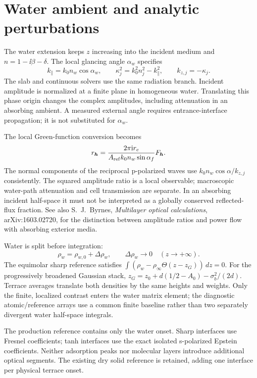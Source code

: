 \section{Water ambient and analytic perturbations}

The water extension keeps $z$ increasing into the incident medium and
$n=1-\ii\beta-\delta$.  The local glancing angle $\alpha_w$ specifies
\begin{equation}
 k_\parallel=k_0 n_w\cos\alpha_w,\qquad
 \kappa_j^2=k_0^2 n_j^2-k_\parallel^2,\qquad
 k_{z,j}=-\kappa_j.
\end{equation}
The slab and continuous solvers use the same radiation branch.  Incident
amplitude is normalized at a finite plane in homogeneous water.  Translating
this phase origin changes the complex amplitudes, including attenuation in an
absorbing ambient.  A measured external angle requires entrance-interface
propagation; it is not substituted for $\alpha_w$.

The local Green-function conversion becomes
\begin{equation}
 r_{\bm h}=\frac{2\pi\mathrm{i} r_e}{A_{\rm ref} k_0 n_w\sin\alpha_f}
 F_{\bm h}.
\end{equation}
The normal components of the reciprocal p-polarized waves use
$k_0 n_w\cos\alpha/k_{z,j}$ consistently.  The squared amplitude ratio is a
local observable; macroscopic water-path attenuation and cell transmission
are separate.  In an absorbing incident half-space it must not be interpreted
as a globally conserved reflected-flux fraction.  See also S.~J.~Byrnes,
\emph{Multilayer optical calculations}, arXiv:1603.02720, for the distinction
between amplitude ratios and power flow with absorbing exterior media.

Water is split before integration:
\begin{equation}
 \rho_w=\rho_{w,0}+\Delta\rho_w,\qquad
 \Delta\rho_w\longrightarrow0\quad (z\longrightarrow+\infty).
\end{equation}
The equimolar sharp reference satisfies
$\int(\rho_w-\rho_\infty\Theta(z-z_G))\,dz=0$.
For the progressively broadened Gaussian stack,
$z_G=z_0+d(1/2-A_0)-\sigma_b^2/(2d)$.
Terrace averages translate both densities by the same heights and weights.
Only the finite, localized contrast enters the water matrix element; the
diagnostic atomic/reference arrays use a common finite baseline rather than
two separately divergent water half-space integrals.


The production reference contains only the water onset.  Sharp interfaces use
Fresnel coefficients; tanh interfaces use the exact isolated s-polarized
Epstein coefficients.  Neither adsorption peaks nor molecular layers introduce
additional optical segments.  The existing dry solid reference is retained,
adding one interface per physical terrace onset.

